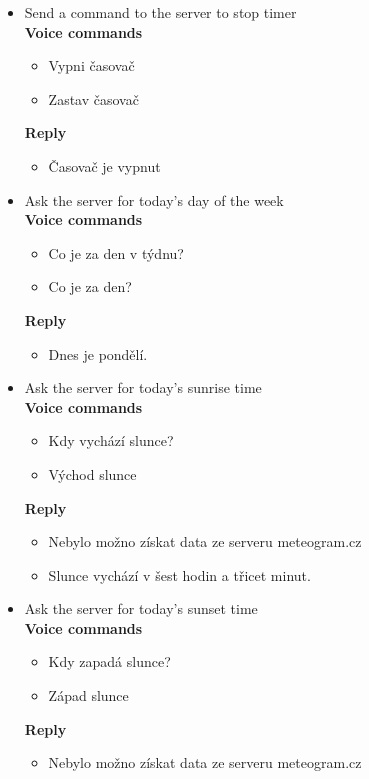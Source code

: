 \begin{itemize}
\begin{itemize}
    \end{itemize}
    \item Send a command to the server to stop timer\\
    \textbf{Voice commands}
    \begin{itemize}
        \item Vypni časovač
        \item Zastav časovač
    \end{itemize}
    \textbf{Reply}
    \begin{itemize}
        \item Časovač je vypnut
    \end{itemize}
    \item Ask the server for today's day of the week\\
    \textbf{Voice commands}
    \begin{itemize}
        \item Co je za den v týdnu?
        \item Co je za den?
    \end{itemize}
    \textbf{Reply}
    \begin{itemize}
        \item Dnes je pondělí.
    \end{itemize}
    \item Ask the server for today's sunrise time\\
    \textbf{Voice commands}
    \begin{itemize}
        \item Kdy vychází slunce?
        \item Východ slunce
    \end{itemize}
    \textbf{Reply}
    \begin{itemize}
        \item Nebylo možno získat data ze serveru meteogram.cz
        \item Slunce vychází v šest hodin a třicet minut.
    \end{itemize}
    \item Ask the server for today's sunset time\\
    \textbf{Voice commands}
    \begin{itemize}
        \item Kdy zapadá slunce?
        \item Západ slunce
    \end{itemize}
    \textbf{Reply}
    \begin{itemize}
        \item Nebylo možno získat data ze serveru meteogram.cz

\end{itemize}
\end{itemize}
